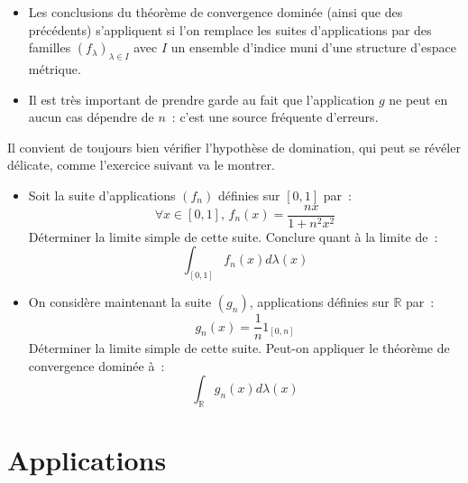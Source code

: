 \begin{rem}
\begin{itemize}
\item Les conclusions du théorème de convergence dominée (ainsi que des
précédents) s'appliquent si l'on remplace les suites d'applications
par des familles $(f_\lambda)_{\lambda \in I}$ avec $I$ un ensemble
d'indice muni d'une structure d'espace métrique. 
\item Il est très important de prendre garde au fait que l'application
  $g$ ne peut en aucun cas dépendre de $n$~: c'est une source
  fréquente d'erreurs.
\end{itemize}
\end{rem}
Il convient de toujours bien vérifier l'hypothèse de domination, qui peut se
révéler délicate, comme l'exercice suivant va le montrer.
\begin{exercice}
\begin{itemize}
\item Soit la suite d'applications $(f_n)$ définies sur $[0,1]$ par~:
\[
\forall x \in [0,1], \, f_n(x) = \frac{nx}{1+n^2x^2}
\]
Déterminer la limite simple de cette suite. Conclure quant à la limite de~:
\[
\int_{[0,1]} f_n(x) d \lambda(x)
\]
\item On considère maintenant la suite $(g_n)$, applications définies sur $\mathbb{R}$ par~:
\[
g_n(x) = \frac{1}{n} 1_{[0, n]}
\]
Déterminer la limite simple de cette suite. Peut-on appliquer le théorème de convergence
dominée à~:
\[
\int_{\mathbb{R}} g_n(x) d\lambda(x)
\]
\end{itemize}
\end{exercice}
\section{Applications}
